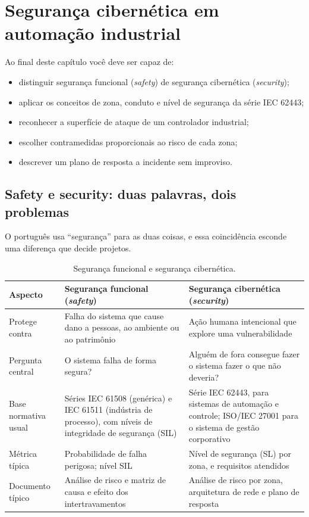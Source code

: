 \chapter{Segurança cibernética em automação industrial}
\label{cap:seguranca}

\begin{objetivos}
Ao final deste capítulo você deve ser capaz de:
\begin{itemize}
  \item distinguir segurança funcional (\emph{safety}) de segurança cibernética (\emph{security});
  \item aplicar os conceitos de zona, conduto e nível de segurança da série IEC 62443;
  \item reconhecer a superfície de ataque de um controlador industrial;
  \item escolher contramedidas proporcionais ao risco de cada zona;
  \item descrever um plano de resposta a incidente sem improviso.
\end{itemize}
\end{objetivos}

\section{Safety e security: duas palavras, dois problemas}

O português usa ``segurança'' para as duas coisas, e essa coincidência esconde uma diferença que
decide projetos.

\begin{table}[H]
  \centering
  \caption{Segurança funcional e segurança cibernética.}
  \label{tab:safety-security}
  \begin{tabular}{p{2.6cm} p{5.6cm} p{6.1cm}}
    \toprule
    Aspecto & Segurança funcional (\emph{safety}) & Segurança cibernética (\emph{security}) \\
    \midrule
    Protege contra
      & Falha do sistema que cause dano a pessoas, ao ambiente ou ao patrimônio
      & Ação humana intencional que explore uma vulnerabilidade \\
    \addlinespace
    Pergunta central
      & O sistema falha de forma segura?
      & Alguém de fora consegue fazer o sistema fazer o que não deveria? \\
    \addlinespace
    Base normativa usual
      & Séries IEC 61508 (genérica) e IEC 61511 (indústria de processo), com níveis de integridade de
        segurança (SIL)
      & Série IEC 62443, para sistemas de automação e controle; ISO/IEC 27001 para o sistema de gestão
        corporativo \\
    \addlinespace
    Métrica típica
      & Probabilidade de falha perigosa; nível SIL
      & Nível de segurança (SL) por zona, e requisitos atendidos \\
    \addlinespace
    Documento típico
      & Análise de risco e matriz de causa e efeito dos intertravamentos
      & Análise de risco por zona, arquitetura de rede e plano de resposta \\
    \bottomrule
  \end{tabular}
\end{table}

